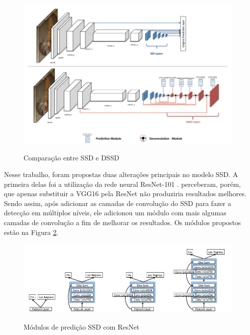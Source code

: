 \begin{figure}[t]
	\setlength{\abovecaptionskip}{0pt}
	\setlength{\belowcaptionskip}{0pt}
	\caption[SSD e DSSD]{Comparação entre \ac{SSD} e \ac{DSSD}}
	\centering
	\includegraphics[width=.8\textwidth]{imagem/0x_comparacao_ssd_dssd.png}
	\captionsetup{justification=centering}
	\label{fig:ssdxdssd}
\end{figure}

Nesse trabalho, foram propostas duas alterações principais no modelo \ac{SSD}. A primeira delas foi a utilização da rede neural ResNet-101 \cite{he-2016}.  perceberam, porém, que apenas substituir a VGG16 pela \ac{ResNet} não produziria resultados melhores. Sendo assim, após adicionar as camadas de convolução do \ac{SSD} para fazer a detecção em múltiplos níveis, ele adicionou um módulo com mais algumas camadas de convolução a fim de melhorar os resultados. Os módulos propostos estão na Figura \ref{fig:ssdpred}.

\begin{figure}[t]
	\setlength{\abovecaptionskip}{0pt}
	\setlength{\belowcaptionskip}{0pt}
	\caption[Módulos de predição SSD com ResNet]{Módulos de predição \ac{SSD} com \ac{ResNet}}
	\centering
	\includegraphics[width=.8\textwidth]{imagem/0x_dssdpredmod.jpg}
	\captionsetup{justification=centering}
	\label{fig:ssdpred}
\end{figure}

